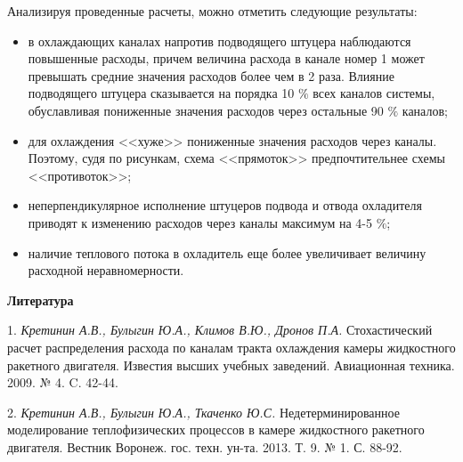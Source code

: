 Анализируя проведенные расчеты, можно отметить следующие результаты:
\begin{itemize}
	\item
	в охлаждающих каналах напротив подводящего штуцера наблюдаются повышенные расходы, причем величина расхода в канале номер 1 может превышать средние значения расходов более чем в 2 раза. Влияние подводящего штуцера сказывается на порядка 10 $\%$ всех каналов системы, обуславливая пониженные значения расходов через остальные 90 $\%$ каналов;

	\item
	для охлаждения <<хуже>> пониженные значения расходов через каналы. Поэтому, судя по рисункам, схема <<прямоток>> предпочтительнее схемы <<противоток>>;

	\item
	неперпендикулярное исполнение штуцеров подвода и отвода охладителя приводят к изменению расходов через каналы максимум на 4-5 $\%$;

	\item
	наличие теплового потока в охладитель еще более увеличивает величину расходной неравномерности.
\end{itemize}
\smallskip \centerline{\bf Литература}\nopagebreak

1. {\it Кретинин А.В., Булыгин Ю.А., Климов В.Ю., Дронов П.А.} Стохастический расчет распределения расхода по каналам тракта охлаждения камеры жидкостного ракетного двигателя. Известия высших учебных заведений. Авиационная техника. 2009. № 4. C. 42-44.

2. {\it Кретинин А.В., Булыгин Ю.А., Ткаченко Ю.С.} Недетерминированное моделирование теплофизических процессов в камере жидкостного ракетного двигателя. Вестник Воронеж. гос. техн. ун-та. 2013. Т. 9. № 1. С. 88-92.
